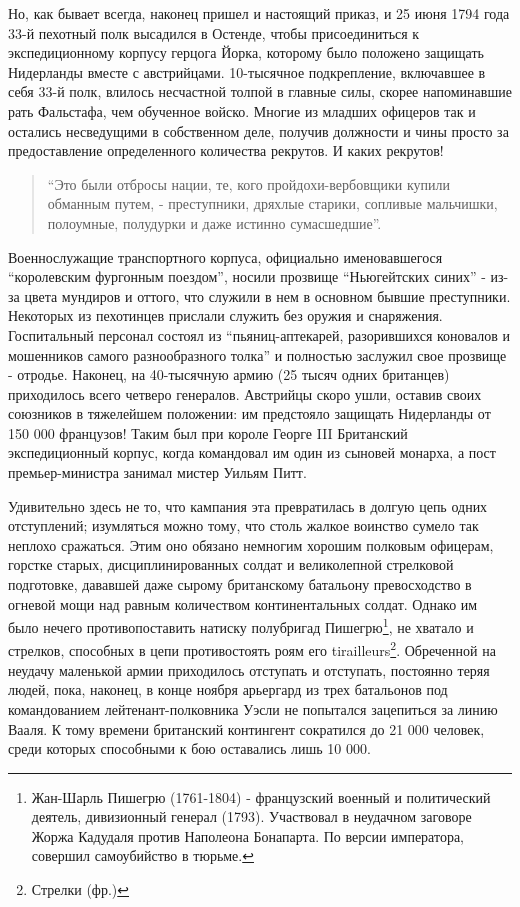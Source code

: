 \documentclass[
  oneside,
  12pt,
  titlepage]{book}
\begin{document}
Но, как бывает всегда, наконец пришел и настоящий приказ, и 25 июня 1794 года 33-й пехотный полк высадился в Остенде, чтобы присоединиться к экспедиционному корпусу герцога Йорка, которому было положено защищать Нидерланды вместе с австрийцами. 10-тысячное подкрепление, включавшее в себя 33-й полк, влилось несчастной толпой в главные силы, скорее напоминавшие рать Фальстафа, чем обученное войско. Многие из младших офицеров так и остались несведущими в собственном деле, получив должности и чины просто за предоставление определенного количества рекрутов. И каких рекрутов!

\begin{quote}
``Это были отбросы нации, те, кого пройдохи-вербовщики купили обманным путем, - преступники, дряхлые старики, сопливые мальчишки, полоумные, полудурки и даже истинно сумасшедшие''.
\end{quote}

Военнослужащие транспортного корпуса, официально именовавшегося ``королевским фургонным поездом'', носили прозвище ``Ньюгейтских синих'' - из-за цвета мундиров и оттого, что служили в нем в основном бывшие преступники. Некоторых из пехотинцев прислали служить без оружия и снаряжения. Госпитальный персонал состоял из ``пьяниц-аптекарей, разорившихся коновалов и мошенников самого разнообразного толка'' и полностью заслужил свое прозвище - отродье. Наконец, на 40-тысячную армию (25 тысяч одних британцев) приходилось всего четверо генералов. Австрийцы скоро ушли, оставив своих союзников в тяжелейшем положении: им предстояло защищать Нидерланды от 150 000 французов! Таким был при короле Георге III Британский экспедиционный корпус, когда командовал им один из сыновей монарха, а пост премьер-министра занимал мистер Уильям Питт.

Удивительно здесь не то, что кампания эта превратилась в долгую цепь одних отступлений; изумляться можно тому, что столь жалкое воинство сумело так неплохо сражаться. Этим оно обязано немногим хорошим полковым офицерам, горстке старых, дисциплинированных солдат и великолепной стрелковой подготовке, дававшей даже сырому британскому батальону превосходство в огневой мощи над равным количеством континентальных солдат. Однако им было нечего противопоставить натиску полубригад Пишегрю\footnote{Жан-Шарль Пишегрю (1761-1804) - французский военный и политический деятель, дивизионный генерал (1793). Участвовал в неудачном заговоре Жоржа Кадудаля против Наполеона Бонапарта. По версии императора, совершил самоубийство в тюрьме.}, не хватало и стрелков, способных в цепи противостоять роям его tirailleurs\footnote{Стрелки (фр.)}. Обреченной на неудачу маленькой армии приходилось отступать и отступать, постоянно теряя людей, пока, наконец, в конце ноября арьергард из трех батальонов под командованием лейтенант-полковника Уэсли не попытался зацепиться за линию Вааля. К тому времени британский контингент сократился до 21 000 человек, среди которых способными к бою оставались лишь 10 000.
\end{document}
